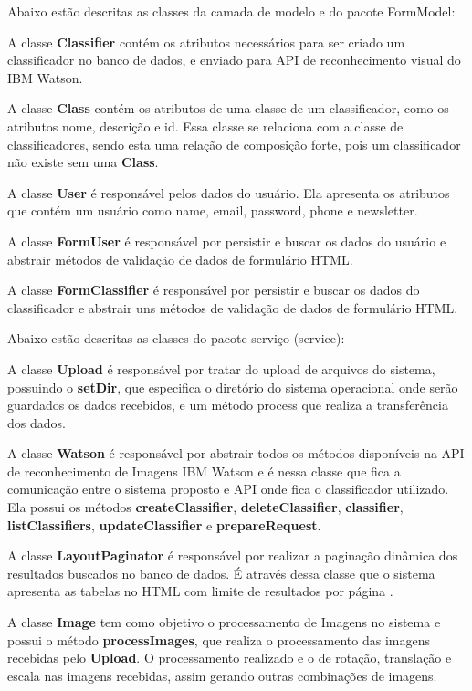\documentclass[openright]{ifrs} %
\begin{document}
Abaixo estão descritas as classes da camada de modelo e do pacote FormModel:



A classe \textbf{Classifier} contém os atributos necessários para ser criado um classificador no banco de dados, e enviado para API de reconhecimento visual do IBM Watson.


A classe \textbf{Class} contém os atributos de uma classe de um classificador, como os atributos nome, descrição e id. Essa classe se relaciona com a classe de classificadores, sendo esta uma relação de composição forte, pois um classificador não existe sem uma  \textbf{Class}.


A classe \textbf{User} é responsável pelos dados do usuário. Ela apresenta os atributos que contém um usuário como name, email, password, phone e newsletter.



A classe \textbf{FormUser} é responsável por persistir e buscar os dados do usuário e abstrair métodos de validação de dados de formulário HTML.


A classe \textbf{FormClassifier} é responsável por persistir e buscar os dados do classificador e abstrair uns métodos de validação de dados de formulário HTML.


Abaixo estão descritas as classes do pacote serviço (service):

A classe \textbf{Upload} é responsável por tratar do upload de arquivos do sistema, possuindo o  \textbf{setDir}, que especifica o diretório do sistema operacional onde serão guardados os dados recebidos, e um método process que realiza a transferência dos dados.



A classe \textbf{Watson} é responsável por abstrair todos os métodos disponíveis na API de reconhecimento de Imagens IBM Watson e é nessa classe que fica a comunicação entre o sistema proposto e API onde fica o classificador utilizado. Ela possui os métodos \textbf{createClassifier}, \textbf{deleteClassifier}, \textbf{classifier}, \textbf{listClassifiers}, 
\textbf{updateClassifier} e \textbf{prepareRequest}.


A classe \textbf{LayoutPaginator} é responsável por realizar a paginação dinâmica  dos resultados buscados no banco de dados. É através dessa classe que o sistema apresenta as tabelas no  HTML  com limite de resultados por página .

A classe \textbf{Image} tem como objetivo o processamento de Imagens no sistema e possui o método \textbf{processImages}, que realiza o processamento das imagens recebidas pelo \textbf{Upload}. O processamento realizado e o de rotação, translação e escala nas imagens recebidas, assim gerando outras combinações de imagens.
\end{document}
